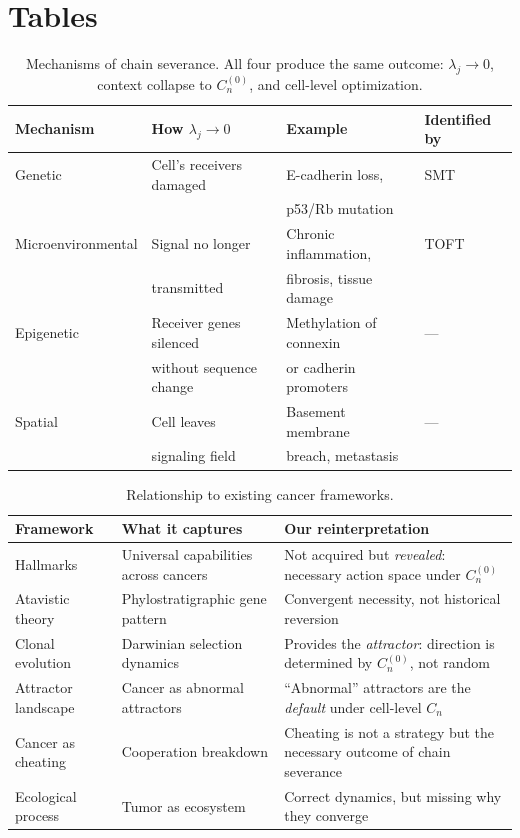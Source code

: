 \documentclass[11pt]{article}
\begin{document}
\section*{Tables}
\begin{landscape}

\begin{table}[p]
\centering
\caption{Mechanisms of chain severance. All four produce the same
outcome: $\lambda_j \to 0$, context collapse to $C_n^{(0)}$, and
cell-level optimization.}
\label{tab:severance-mechanisms}
\begin{tabular}{@{}llll@{}}
\toprule
Mechanism & How $\lambda_j \to 0$ & Example & Identified by \\
\midrule
Genetic & Cell's receivers damaged & E-cadherin loss, & SMT \\
 & & p53/Rb mutation & \cite{Vogelstein2013} \\[4pt]
Microenvironmental & Signal no longer & Chronic inflammation, & TOFT \\
 & transmitted & fibrosis, tissue damage & \cite{Sonnenschein2000} \\[4pt]
Epigenetic & Receiver genes silenced & Methylation of connexin & --- \\
 & without sequence change & or cadherin promoters & \\[4pt]
Spatial & Cell leaves & Basement membrane & --- \\
 & signaling field & breach, metastasis & \\
\bottomrule
\end{tabular}
\end{table}

\begin{table}[p]
\centering
\caption{Relationship to existing cancer frameworks.}
\label{tab:prior-work}
\begin{tabular}{@{}>{\raggedright}p{3.5cm}>{\raggedright}p{6cm}>{\raggedright\arraybackslash}p{12cm}@{}}
\toprule
Framework & What it captures & Our reinterpretation \\
\midrule
Hallmarks \cite{Hanahan2011}
 & Universal capabilities across cancers
 & Not acquired but \emph{revealed}: necessary action space under $C_n^{(0)}$ \\[4pt]
Atavistic theory \cite{Davies2011}
 & Phylostratigraphic gene pattern
 & Convergent necessity, not historical reversion \\[4pt]
Clonal evolution \cite{Nowell1976}
 & Darwinian selection dynamics
 & Provides the \emph{attractor}: direction is determined by $C_n^{(0)}$, not random \\[4pt]
Attractor landscape \cite{Huang2009}
 & Cancer as abnormal attractors
 & ``Abnormal'' attractors are the \emph{default} under cell-level $C_n$ \\[4pt]
Cancer as cheating \cite{Aktipis2015}
 & Cooperation breakdown
 & Cheating is not a strategy but the necessary outcome of chain severance \\[4pt]
Ecological process \cite{Merlo2006}
 & Tumor as ecosystem
 & Correct dynamics, but missing why they converge \\
\bottomrule
\end{tabular}
\end{table}


\end{landscape}
\end{document}
